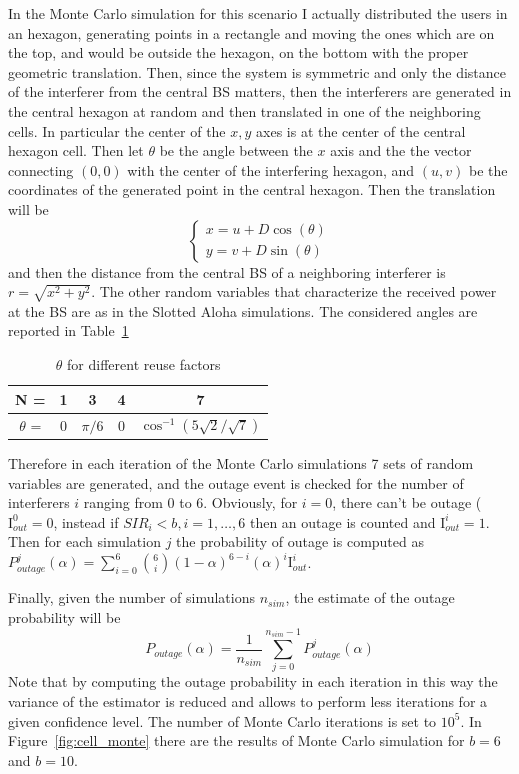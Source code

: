 \documentclass[10pt]{article}
\begin{document}
In the Monte Carlo simulation for this scenario I actually distributed the users in an hexagon, generating points in a rectangle and moving the ones which are on the top, and would be outside the hexagon, on the bottom with the proper geometric translation. Then, since the system is symmetric and only the distance of the interferer from the central BS matters, then the interferers are generated in the central hexagon at random and then translated in one of the neighboring cells. In particular the center of the $x, y$ axes is at the center of the central hexagon cell. Then let $\theta$ be the angle between the $x$ axis and the the vector connecting $(0, 0)$ with the center of the interfering hexagon, and $(u, v)$ be the coordinates of the generated point in the central hexagon. Then the translation will be
\begin{equation}
  \begin{cases}
  x = u + D\cos(\theta) \\
  y = v + D\sin(\theta)
  \end{cases}
\end{equation}
and then the distance from the central BS of a neighboring interferer is $r = \sqrt{x^2 + y^2}$. The other random variables that characterize the received power at the BS are as in the Slotted Aloha simulations. The considered angles are reported in Table~\ref{table:angles}
\begin{table}[h!]
\centering
  \begin{tabular}{c|c|c|c|c}
  N = & 1 & 3 & 4 & 7 \\ \hline
  $\theta$ = & 0 & $\pi/6$ & 0 & $\cos^{-1}({5\sqrt{2}/\sqrt{7}})$
  \end{tabular}
  \caption{$\theta$ for different reuse factors}
  \label{table:angles}
\end{table}

Therefore in each iteration of the Monte Carlo simulations 7 sets of random variables are generated, and the outage event is checked for the number of interferers $i$ ranging from 0 to 6. Obviously, for $i = 0$, there can't be outage ($\mathrm{I}_{out}^0 = 0$, instead if $SIR_i < b, i = 1, \dots, 6$ then an outage is counted and $\mathrm{I}_{out}^i = 1$. Then for each simulation $j$ the probability of outage is computed as $P_{outage}^j(\alpha) = \sum_{i = 0}^{6} \binom{6}{i} (1 - \alpha)^{6-i}(\alpha)^i \mathrm{I}_{out}^i$. 

Finally, given the number of simulations $n_{sim}$, the estimate of the outage probability will be
\begin{equation}
  P_{outage}(\alpha) = \frac{1}{n_{sim}} \sum_{j = 0}^{n_{sim} - 1} P_{outage}^j(\alpha)
\end{equation}
Note that by computing the outage probability in each iteration in this way the variance of the estimator is reduced and allows to perform less iterations for a given confidence level. The number of Monte Carlo iterations is set to $10^5$. In Figure~\ref{fig:cell_monte} there are the results of Monte Carlo simulation for $b = 6$ and $b = 10$.
\end{document}
